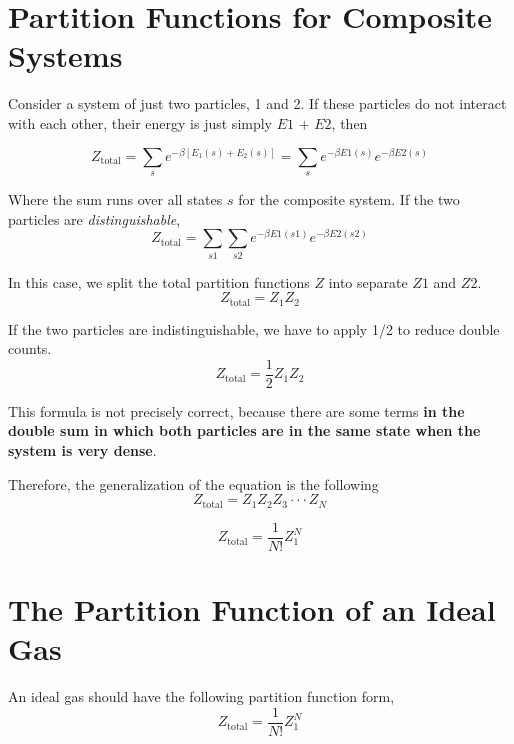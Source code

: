 
\section{Partition Functions for Composite Systems}
Consider a system of just two particles, 1 and 2. If these particles do not interact with each other, their energy is just simply $E1$ + $E2$, then

\begin{equation}
Z_\text{total} = \sum_{s} e^{-\beta[E_1(s)+E_2(s)]} = \sum_{s} e^{-\beta E1(s)} e^{-\beta E2(s)}
\end{equation}
 
Where the sum runs over all states $s$ for the composite system. If the two particles are \textit{distinguishable},
\begin{equation}
Z_\text{total} = \sum_{s1}\sum_{s2} e^{-\beta E1(s1)} e^{-\beta E2(s2)}
\end{equation}
 
In this case, we split the total partition functions $Z$ into separate $Z1$ and $Z2$.
\begin{equation}
Z_\text{total} = Z_1Z_2
\end{equation}
 
If the two particles are indistinguishable, we have to apply 1/2 to reduce double counts.
\begin{equation}
Z_\text{total} = \frac{1}{2}Z_1Z_2
\end{equation}

This formula is not precisely correct, because there are some terms {\bf in the double sum in which both particles are in the same state 
when the system is very dense}. 

Therefore, the generalization of the equation is the following
\begin{equation}
Z_\text{total} = Z_1Z_2Z_3\cdot\cdot\cdot Z_N
\end{equation}

\begin{equation}
Z_\text{total} = \frac{1}{N!}Z_1^N
\end{equation}

\section{The Partition Function of an Ideal Gas}
An ideal gas should have the following partition function form,
\begin{equation}
Z_\text{total} = \frac{1}{N!}Z_1^N
\end{equation}

